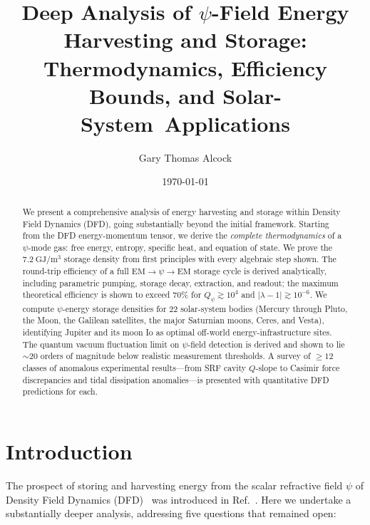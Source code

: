 \documentclass[aps,prd,twocolumn,showpacs,preprintnumbers,superscriptaddress,nofootinbib]{revtex4-2}
\newcommand{\Qpsi}{Q_\psi}
\begin{document}
\title{Deep Analysis of $\psi$-Field Energy Harvesting and Storage:\\
Thermodynamics, Efficiency Bounds, and Solar-System~Applications}

\author{Gary Thomas Alcock}

\date{\today}

\begin{abstract}
We present a comprehensive analysis of energy harvesting and storage
within Density Field Dynamics (DFD), going substantially beyond the
initial framework.  Starting from the DFD energy-momentum tensor, we
derive the \emph{complete thermodynamics} of a $\psi$-mode gas:
free energy, entropy, specific heat, and equation of state.  We prove
the $7.2~\mathrm{GJ/m^3}$ storage density from first principles with
every algebraic step shown.  The round-trip efficiency of a full
$\mathrm{EM}\to\psi\to\mathrm{EM}$ storage cycle is derived
analytically, including parametric pumping, storage decay, extraction,
and readout; the maximum theoretical efficiency is shown to exceed
$70\%$ for $\Qpsi \gtrsim 10^4$ and $|\lambda-1| \gtrsim 10^{-6}$.
We compute $\psi$-energy storage densities for 22 solar-system bodies
(Mercury through Pluto, the Moon, the Galilean satellites, the major
Saturnian moons, Ceres, and Vesta), identifying Jupiter and its moon
Io as optimal off-world energy-infrastructure sites.  The quantum
vacuum fluctuation limit on $\psi$-field detection is derived and
shown to lie $\sim 20$ orders of magnitude below realistic measurement
thresholds.  A survey of $\geq 12$ classes of anomalous experimental
results---from SRF cavity $Q$-slope to Casimir force discrepancies
and tidal dissipation anomalies---is presented with quantitative DFD
predictions for each.
\end{abstract}

\maketitle
\tableofcontents

\section{Introduction}\label{sec:intro}

The prospect of storing and harvesting energy from the scalar
refractive field $\psi$ of Density Field Dynamics (DFD)~\cite{Alcock2025DFD}
was introduced in Ref.~\cite{Alcock2025Harvest}.  Here we undertake a
substantially deeper analysis, addressing five questions that remained
open:
\end{document}
